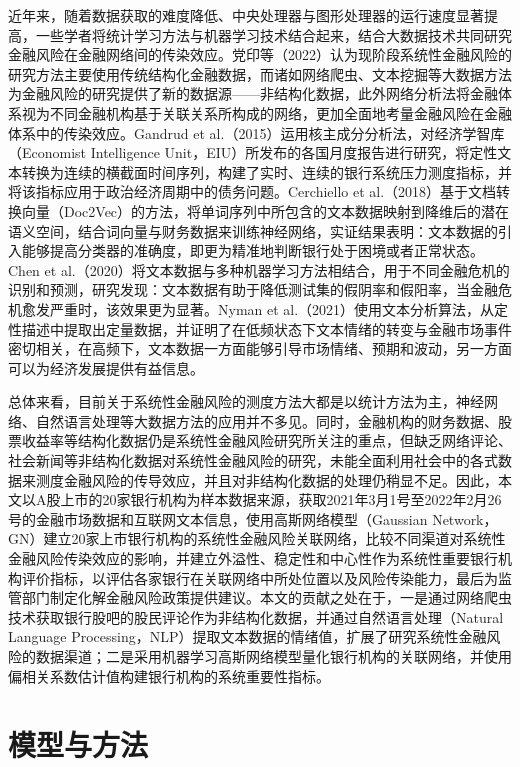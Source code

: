 \documentclass[lang=cn]{elegantpaper}
\begin{document}
近年来，随着数据获取的难度降低、中央处理器与图形处理器的运行速度显著提高，一些学者将统计学习方法与机器学习技术结合起来，结合大数据技术共同研究金融风险在金融网络间的传染效应。党印等（2022）\cite{20}认为现阶段系统性金融风险的研究方法主要使用传统结构化金融数据，而诸如网络爬虫、文本挖掘等大数据方法为金融风险的研究提供了新的数据源——非结构化数据，此外网络分析法将金融体系视为不同金融机构基于关联关系所构成的网络，更加全面地考量金融风险在金融体系中的传染效应。Gandrud et al.（2015）\cite{21}运用核主成分分析法，对经济学智库（Economist Intelligence Unit，EIU）所发布的各国月度报告进行研究，将定性文本转换为连续的横截面时间序列，构建了实时、连续的银行系统压力测度指标，并将该指标应用于政治经济周期中的债务问题。Cerchiello et al.（2018）\cite{22}基于文档转换向量（Doc2Vec）的方法，将单词序列中所包含的文本数据映射到降维后的潜在语义空间，结合词向量与财务数据来训练神经网络，实证结果表明：文本数据的引入能够提高分类器的准确度，即更为精准地判断银行处于困境或者正常状态。Chen et al.（2020）\cite{23}将文本数据与多种机器学习方法相结合，用于不同金融危机的识别和预测，研究发现：文本数据有助于降低测试集的假阴率和假阳率，当金融危机愈发严重时，该效果更为显著。Nyman et al.（2021）\cite{24}使用文本分析算法，从定性描述中提取出定量数据，并证明了在低频状态下文本情绪的转变与金融市场事件密切相关，在高频下，文本数据一方面能够引导市场情绪、预期和波动，另一方面可以为经济发展提供有益信息。

总体来看，目前关于系统性金融风险的测度方法大都是以统计方法为主，神经网络、自然语言处理等大数据方法的应用并不多见。同时，金融机构的财务数据、股票收益率等结构化数据仍是系统性金融风险研究所关注的重点，但缺乏网络评论、社会新闻等非结构化数据对系统性金融风险的研究，未能全面利用社会中的各式数据来测度金融风险的传导效应，并且对非结构化数据的处理仍稍显不足。因此，本文以A股上市的20家银行机构为样本数据来源，获取2021年3月1号至2022年2月26号的金融市场数据和互联网文本信息，使用高斯网络模型（Gaussian Network，GN）建立20家上市银行机构的系统性金融风险关联网络，比较不同渠道对系统性金融风险传染效应的影响，并建立外溢性、稳定性和中心性作为系统性重要银行机构评价指标，以评估各家银行在关联网络中所处位置以及风险传染能力，最后为监管部门制定化解金融风险政策提供建议。本文的贡献之处在于，一是通过网络爬虫技术获取银行股吧的股民评论作为非结构化数据，并通过自然语言处理（Natural Language Processing，NLP）提取文本数据的情绪值，扩展了研究系统性金融风险的数据渠道；二是采用机器学习高斯网络模型量化银行机构的关联网络，并使用偏相关系数估计值构建银行机构的系统重要性指标。

\section{模型与方法}
\end{document}
